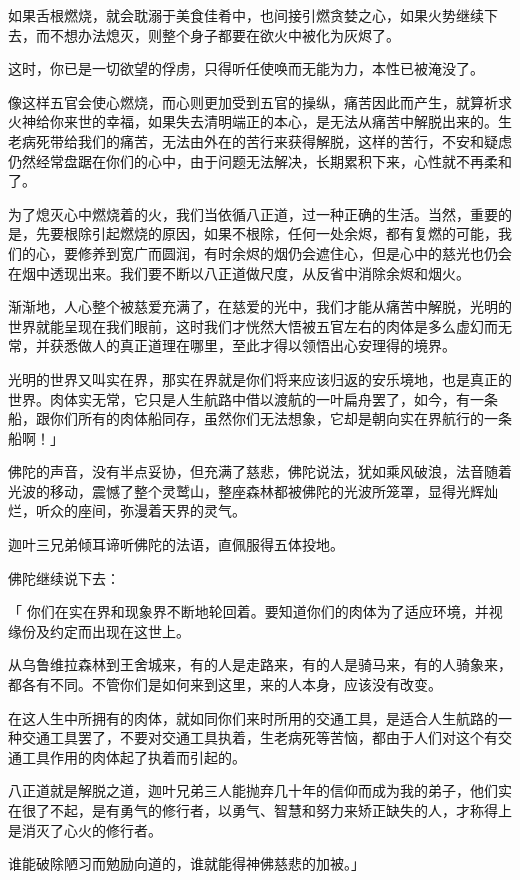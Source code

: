 \documentclass[12pt,twoside,openany]{book}
\begin{document}
如果舌根燃烧，就会耽溺于美食佳肴中，也间接引燃贪婪之心，如果火势继续下去，而不想办法熄灭，则整个身子都要在欲火中被化为灰烬了。

这时，你已是一切欲望的俘虏，只得听任使唤而无能为力，本性已被淹没了。

像这样五官会使心燃烧，而心则更加受到五官的操纵，痛苦因此而产生，就算祈求火神给你来世的幸福，如果失去清明端正的本心，是无法从痛苦中解脱出来的。生老病死带给我们的痛苦，无法由外在的苦行来获得解脱，这样的苦行，不安和疑虑仍然经常盘踞在你们的心中，由于问题无法解决，长期累积下来，心性就不再柔和了。

为了熄灭心中燃烧着的火，我们当依循八正道，过一种正确的生活。当然，重要的是，先要根除引起燃烧的原因，如果不根除，任何一处余烬，都有复燃的可能，我们的心，要修养到宽广而圆润，有时余烬的烟仍会遮住心，但是心中的慈光也仍会在烟中透现出来。我们要不断以八正道做尺度，从反省中消除余烬和烟火。

渐渐地，人心整个被慈爱充满了，在慈爱的光中，我们才能从痛苦中解脱，光明的世界就能呈现在我们眼前，这时我们才恍然大悟被五官左右的肉体是多么虚幻而无常，并获悉做人的真正道理在哪里，至此才得以领悟出心安理得的境界。

光明的世界又叫实在界，那实在界就是你们将来应该归返的安乐境地，也是真正的世界。肉体实无常，它只是人生航路中借以渡航的一叶扁舟罢了，如今，有一条船，跟你们所有的肉体船同存，虽然你们无法想象，它却是朝向实在界航行的一条船啊！」

佛陀的声音，没有半点妥协，但充满了慈悲，佛陀说法，犹如乘风破浪，法音随着光波的移动，震憾了整个灵鹫山，整座森林都被佛陀的光波所笼罩，显得光辉灿烂，听众的座间，弥漫着天界的灵气。

迦叶三兄弟倾耳谛听佛陀的法语，直佩服得五体投地。

佛陀继续说下去：

「  你们在实在界和现象界不断地轮回着。要知道你们的肉体为了适应环境，并视缘份及约定而出现在这世上。

从乌鲁维拉森林到王舍城来，有的人是走路来，有的人是骑马来，有的人骑象来，都各有不同。不管你们是如何来到这里，来的人本身，应该没有改变。

在这人生中所拥有的肉体，就如同你们来时所用的交通工具，是适合人生航路的一种交通工具罢了，不要对交通工具执着，生老病死等苦恼，都由于人们对这个有交通工具作用的肉体起了执着而引起的。

八正道就是解脱之道，迦叶兄弟三人能抛弃几十年的信仰而成为我的弟子，他们实在很了不起，是有勇气的修行者，以勇气、智慧和努力来矫正缺失的人，才称得上是消灭了心火的修行者。

谁能破除陋习而勉励向道的，谁就能得神佛慈悲的加被。」
\end{document}
